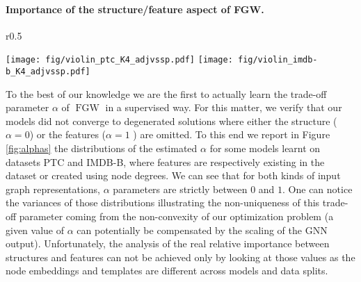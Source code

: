 \documentclass{article}
\newcommand{\FGW}{\operatorname{FGW}}
\begin{document}
\paragraph{Importance of the structure/feature aspect of FGW.} \begin{wrapfigure}{r}{0.5\textwidth}  \vspace{-5mm}
	\begin{center}
		\texttt{[image: fig/violin\_ptc\_K4\_adjvssp.pdf]}
		\texttt{[image: fig/violin\_imdb-b\_K4\_adjvssp.pdf]}
		
	\end{center}
	\vspace{-5mm}
	\caption{\label{fig:alphas}Distributions of estimated $\alpha$.} 
\end{wrapfigure}
To the best of our knowledge we are the first to actually learn the
trade-off parameter $\alpha$ of $\FGW$ in a supervised way. For this matter, we
verify that our models did not converge to degenerated solutions where either
the structure ($\alpha =0$) or the features ($\alpha=1$ ) are omitted. To
this end we report in Figure \ref{fig:alphas} the distributions of the estimated
$\alpha$ for some models learnt on datasets PTC and IMDB-B, where features are respectively existing in the dataset or created using node degrees. We can see that for both 
kinds of input graph representations,
$\alpha$ parameters are strictly between $0$ and $1$. One can notice the variances of those
distributions illustrating the non-uniqueness of this trade-off parameter coming
from the non-convexity of our optimization problem (a given value of $\alpha$
can potentially be compensated by the scaling of the GNN output). Unfortunately, the
analysis of the real relative importance between structures and features can not
be achieved only by looking at those values as the node embeddings and templates
are different across models and data splits.
\end{document}
